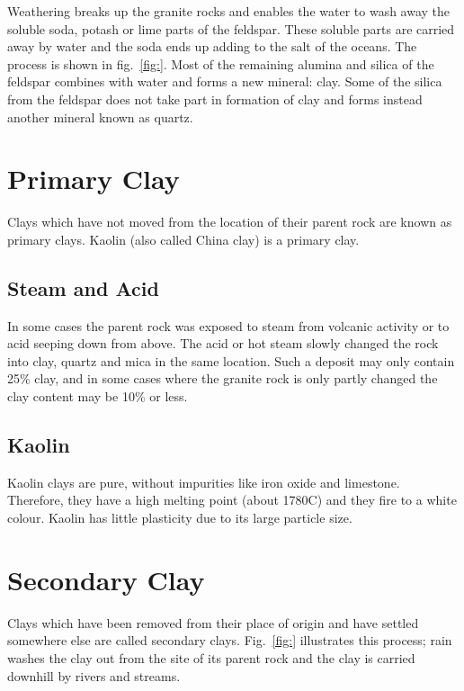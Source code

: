 Weathering breaks up the granite rocks and enables the water to wash away the 
soluble soda, potash or lime parts of the feldspar. These soluble parts are 
carried away by water and the soda ends up adding to the salt of the oceans. 
The process is shown in fig.~\ref{fig:}. Most of the remaining alumina and 
silica of the feldspar combines with water and forms a new mineral: clay. Some 
of the silica from the feldspar does not take part in formation of clay and 
forms instead another mineral known as quartz.
\section{Primary Clay}
Clays which have not moved from the location of their parent rock are known as 
primary clays. Kaolin (also called China clay) is a primary clay.
\subsection{Steam and Acid}
In some cases the parent rock was exposed to steam from volcanic activity or to 
acid seeping down from above. The acid or hot steam slowly changed the rock 
into clay, quartz and mica in the same location. Such a deposit may only 
contain 25\% clay, and in some cases where the granite rock is only partly 
changed the clay content may be 10\% or less.
\subsection{Kaolin}
Kaolin clays are pure, without impurities like iron oxide and limestone. 
Therefore, they have a high melting point (about 1780\degree C) and they fire 
to a white colour. Kaolin has little plasticity due to its large particle size.
\section{Secondary Clay}
Clays which have been removed from their place of origin and have settled 
somewhere else are called secondary clays. Fig.~\ref{fig:} illustrates this 
process; rain washes the clay out from the site of its parent rock and the clay 
is carried downhill by rivers and streams.
